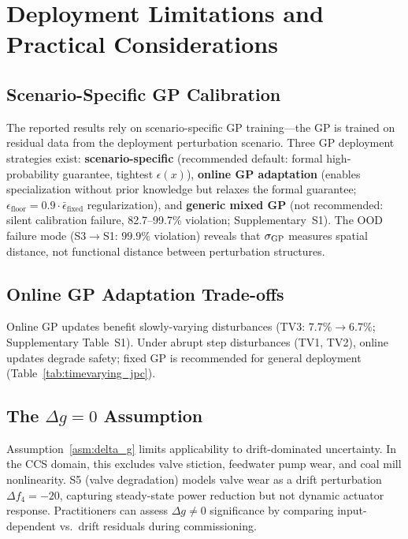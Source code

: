 \section{Deployment Limitations and Practical Considerations}
\label{sec:deployment}

\subsection{Scenario-Specific GP Calibration}

The reported results rely on scenario-specific GP training---the GP is trained on residual data from the deployment perturbation scenario. Three GP deployment strategies exist: \textbf{scenario-specific} (recommended default: formal high-probability guarantee, tightest $\epsilon(x)$), \textbf{online GP adaptation} (enables specialization without prior knowledge but relaxes the formal guarantee; $\epsilon_{\mathrm{floor}} = 0.9 \cdot \bar{\epsilon}_{\mathrm{fixed}}$ regularization), and \textbf{generic mixed GP} (not recommended: silent calibration failure, 82.7--99.7\% violation; Supplementary~S1). The OOD failure mode (S3$\to$S1: $99.9\%$ violation) reveals that $\sigma_{\mathrm{GP}}$ measures spatial distance, not functional distance between perturbation structures.

\subsection{Online GP Adaptation Trade-offs}

Online GP updates benefit slowly-varying disturbances (TV3: $7.7\%\to6.7\%$; Supplementary Table~S1). Under abrupt step disturbances (TV1, TV2), online updates degrade safety; fixed GP is recommended for general deployment (Table~\ref{tab:timevarying_jpc}).

\subsection{The $\Delta g = 0$ Assumption}

Assumption~\ref{asm:delta_g} limits applicability to drift-dominated uncertainty. In the CCS domain, this excludes valve stiction, feedwater pump wear, and coal mill nonlinearity. S5 (valve degradation) models valve wear as a drift perturbation $\Delta f_4 = -20$, capturing steady-state power reduction but not dynamic actuator response. Practitioners can assess $\Delta g \neq 0$ significance by comparing input-dependent vs.\ drift residuals during commissioning.

